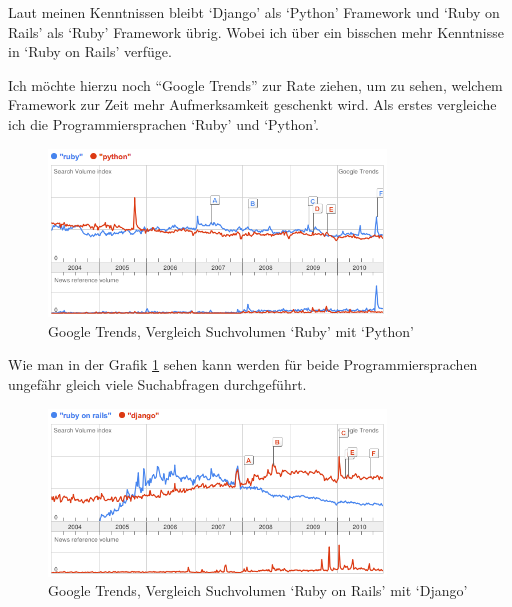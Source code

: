 Laut meinen Kenntnissen bleibt `Django' als `Python' Framework und `Ruby on Rails'
als `Ruby' Framework übrig. Wobei ich über ein bisschen mehr Kenntnisse in
`Ruby on Rails' verfüge.

Ich möchte hierzu noch ``Google Trends'' \cite{googletrends} zur Rate ziehen, um zu sehen, welchem
Framework zur Zeit mehr Aufmerksamkeit geschenkt wird. Als erstes vergleiche ich
die Programmiersprachen `Ruby' und `Python'.

\begin{figure}[h]
    \begin{center}
        \includegraphics[width=0.8\textwidth,angle=0]{./bilder/ruby_vs_python.png}
        \caption{Google Trends, Vergleich Suchvolumen `Ruby' mit `Python'}
        \label{ruby_vs_python}
    \end{center}
\end{figure}

Wie man in der Grafik \ref{ruby_vs_python} sehen kann werden für beide Programmiersprachen
ungefähr gleich viele Suchabfragen durchgeführt.

\begin{figure}[ht]
    \begin{center}
        \includegraphics[width=0.8\textwidth,angle=0]{./bilder/ruby_on_rails_vs_django.png}
        \caption{Google Trends, Vergleich Suchvolumen `Ruby on Rails' mit `Django'}
        \label{ruby_on_rails_vs_django}
    \end{center}
\end{figure}

